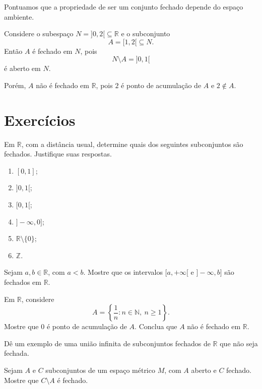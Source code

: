 Pontuamos que a propriedade de ser um conjunto fechado depende do espaço ambiente.

\begin{example}
    Considere o subespaço $N=]0,2[\subseteq\mathbb R$ e o subconjunto
    \[
        A=[1,2[ \subseteq N.
    \]
    Então $A$ é fechado em $N$, pois
    \[
        N\setminus A = ]0,1[
    \]
    é aberto em $N$.

    Porém, $A$ não é fechado em $\mathbb R$, pois $2$ é ponto de acumulação de $A$ e $2\notin A$.
\end{example}

\section*{Exercícios}

\begin{exercise}
    Em $\mathbb R$, com a distância usual, determine quais dos seguintes subconjuntos são fechados.
    Justifique suas respostas.
    \begin{enumerate}[label=(\alph*)]
        \item $[0,1]$;
        \item $]0,1[$;
        \item $[0,1[$;
        \item $]-\infty,0]$;
        \item $\mathbb R\setminus\{0\}$;
        \item $\mathbb Z$.
    \end{enumerate}
\end{exercise}

\begin{exercise}
    Sejam $a,b\in\mathbb R$, com $a<b$.
    Mostre que os intervalos $[a,+\infty[$ e $]-\infty,b]$ são fechados em $\mathbb R$.
\end{exercise}

\begin{exercise}
    Em $\mathbb R$, considere
    \[
        A=\left\{\frac1n:n\in\mathbb N,\ n\geq 1\right\}.
    \]
    Mostre que $0$ é ponto de acumulação de $A$.
    Conclua que $A$ não é fechado em $\mathbb R$.
\end{exercise}

\begin{exercise}
    Dê um exemplo de uma união infinita de subconjuntos fechados de $\mathbb R$ que não seja fechada.
\end{exercise}

\begin{exercise}
    Sejam $A$ e $C$ subconjuntos de um espaço métrico $M$, com $A$ aberto e $C$ fechado.
    Mostre que $C\setminus A$ é fechado.
\end{exercise}

